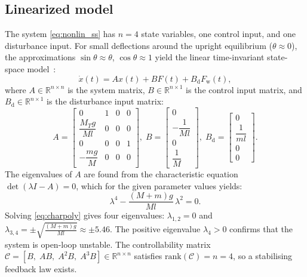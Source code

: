 \documentclass[twocolumn]{svjour3}
\begin{document}
\subsection{Linearized model}
The system \eqref{eq:nonlin_ss} has $n=4$ state variables, one control input, and one
disturbance input.
For small deflections around the upright equilibrium ($\theta\approx 0$), the approximations
$\sin\theta\approx\theta$, $\cos\theta\approx 1$ yield the linear time-invariant
state-space model~\cite{Prasad2014}:
\begin{equation}
\dot{x}(t) = Ax(t) + BF(t) + B_\mathrm{d}F_\mathrm{w}(t),
\label{eq:linsys}
\end{equation}
where $A\in\mathbb{R}^{n\times n}$ is the system matrix, $B\in\mathbb{R}^{n\times 1}$ is the
control input matrix, and $B_\mathrm{d}\in\mathbb{R}^{n\times 1}$ is the disturbance input
matrix:
\begin{equation}
A = \begin{bmatrix}0&1&0&0\\ \dfrac{M_T g}{Ml}&0&0&0\\[4pt]0&0&0&1\\[2pt]-\dfrac{mg}{M}&0&0&0\end{bmatrix},\;
B = \begin{bmatrix}0\\[2pt]-\dfrac{1}{Ml}\\[4pt]0\\[2pt]\dfrac{1}{M}\end{bmatrix},\;
B_\mathrm{d} = \begin{bmatrix}0\\[2pt]\dfrac{1}{ml}\\[4pt]0\\[2pt]0\end{bmatrix}.
\label{eq:linear}
\end{equation}
The eigenvalues of $A$ are found from the characteristic equation $\det(\lambda I - A)=0$,
which for the given parameter values yields:
\begin{equation}
\lambda^4 - \frac{(M+m)g}{Ml}\,\lambda^2 = 0.
\label{eq:charpoly}
\end{equation}
Solving \eqref{eq:charpoly} gives four eigenvalues:
$\lambda_{1,2}=0$ and $\lambda_{3,4}=\pm\sqrt{\tfrac{(M+m)g}{Ml}}\approx\pm 5.46$.
The positive eigenvalue $\lambda_4>0$ confirms that the system is open-loop unstable.
The controllability matrix $\mathcal{C}=[B,\;AB,\;A^2B,\;A^3B]\in\mathbb{R}^{n\times n}$
satisfies $\mathrm{rank}(\mathcal{C})=n=4$, so a stabilising feedback law exists.
\end{document}
